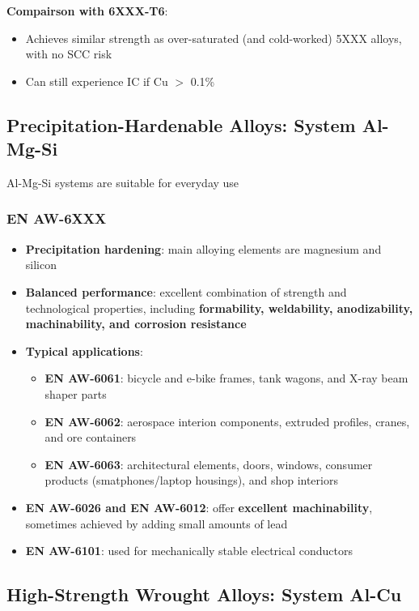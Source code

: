 \documentclass{article}
\begin{document}
\textbf{Compairson with 6XXX-T6}:
\begin{itemize}
  \item Achieves similar strength as over-saturated (and cold-worked) 5XXX alloys, with no SCC risk
  \item Can still experience IC if Cu $>$ 0.1\%
\end{itemize}

\newpage
\subsection{Precipitation-Hardenable Alloys: System Al-Mg-Si}
Al-Mg-Si systems are suitable for everyday use

\subsubsection{EN AW-6XXX}
\begin{itemize}
  \item \textbf{Precipitation hardening}: main alloying elements are magnesium and silicon
  \item \textbf{Balanced performance}: excellent combination of strength and technological properties, including \textbf{formability, weldability, anodizability, machinability, and corrosion resistance}
  \item \textbf{Typical applications}:
  \begin{itemize}
    \item \textbf{EN AW-6061}: bicycle and e-bike frames, tank wagons, and X-ray beam shaper parts
    \item \textbf{EN AW-6062}: aerospace interion components, extruded profiles, cranes, and ore containers
    \item \textbf{EN AW-6063}: architectural elements, doors, windows, consumer products (smatphones/laptop housings), and shop interiors
  \end{itemize}
  \item \textbf{EN AW-6026 and EN AW-6012}: offer \textbf{excellent machinability}, sometimes achieved by adding small amounts of lead
  \item \textbf{EN AW-6101}: used for mechanically stable electrical conductors
\end{itemize}

\subsection{High-Strength Wrought Alloys: System Al-Cu}
\end{document}
